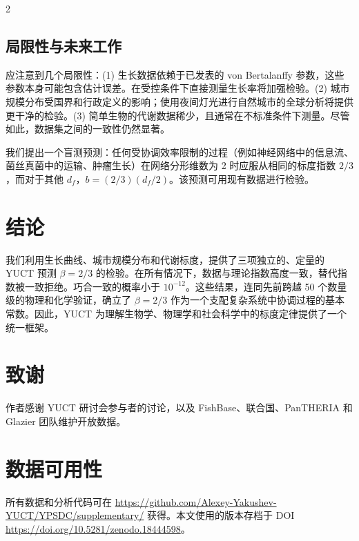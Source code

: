 \documentclass[11pt,a4paper]{article}
\newcommand{\df}{d_f}
\begin{document}
\begin{multicols}{2}
		\subsection{局限性与未来工作}
		
		应注意到几个局限性：(1) 生长数据依赖于已发表的 von Bertalanffy 参数，这些参数本身可能包含估计误差。在受控条件下直接测量生长率将加强检验。(2) 城市规模分布受国界和行政定义的影响；使用夜间灯光进行自然城市的全球分析将提供更干净的检验。(3) 简单生物的代谢数据稀少，且通常在不标准条件下测量。尽管如此，数据集之间的一致性仍然显著。
		
		我们提出一个盲测预测：任何受协调效率限制的过程（例如神经网络中的信息流、菌丝真菌中的运输、肿瘤生长）在网络分形维数为 2 时应服从相同的标度指数 \(2/3\)，而对于其他 \(\df\)，\(b = (2/3)(\df/2)\)。该预测可用现有数据进行检验。
		
		\section{结论}
		
		我们利用生长曲线、城市规模分布和代谢标度，提供了三项独立的、定量的 YUCT 预测 \(\beta = 2/3\) 的检验。在所有情况下，数据与理论指数高度一致，替代指数被一致拒绝。巧合一致的概率小于 \(10^{-12}\)。这些结果，连同先前跨越 50 个数量级的物理和化学验证，确立了 \(\beta = 2/3\) 作为一个支配复杂系统中协调过程的基本常数。因此，YUCT 为理解生物学、物理学和社会科学中的标度定律提供了一个统一框架。
		
		\section*{致谢}
		
		作者感谢 YUCT 研讨会参与者的讨论，以及 FishBase、联合国、PanTHERIA 和 Glazier 团队维护开放数据。
		
		\section*{数据可用性}
		
		所有数据和分析代码可在 \url{https://github.com/Alexey-Yakushev-YUCT/YPSDC/supplementary/} 获得。本文使用的版本存档于 DOI \url{https://doi.org/10.5281/zenodo.18444598}。
		

\end{multicols}
\end{document}
